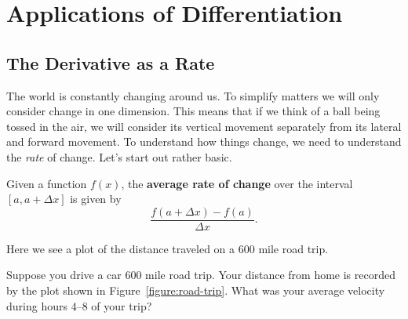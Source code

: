 \chapter{Applications of Differentiation}

\section{The Derivative as a Rate}

The world is constantly changing around us. To simplify matters we
will only consider change in one dimension. This means that if we
think of a ball being tossed in the air, we will consider its vertical
movement separately from its lateral and forward movement.  To
understand how things change, we need to understand the \textit{rate}
of change. Let's start out rather basic.

\begin{definition}
Given a function $f(x)$, the \textbf{average rate of change} over the
interval $[a, a+\Delta x]$ is given by
\[
\frac{f(a+\Delta x) - f(a)}{\Delta x}.
\]
\end{definition}
\begin{marginfigure}
\caption{Here we see a plot of the distance traveled on a $600$ mile road trip.}
\label{figure:road-trip}
\end{marginfigure}

\begin{example}
Suppose you drive a car $600$ mile road trip. Your distance from home is
recorded by the plot shown in Figure~\ref{figure:road-trip}. What was
your average velocity during hours $4$--$8$ of your trip?
\end{example}

